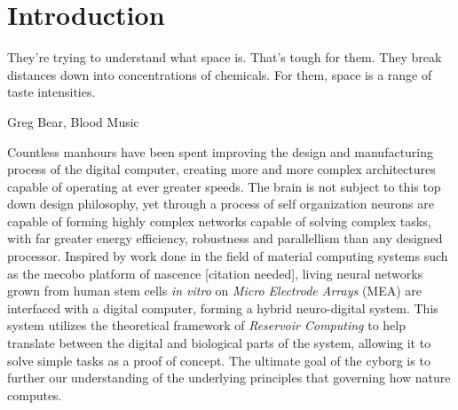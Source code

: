 \chapter{Introduction}
\epigraph{They're trying to understand what space is. That's tough for them.
They break distances down into concentrations of chemicals. For them, space is a
range of taste intensities.}{Greg Bear, Blood Music}
%
Countless manhours have been spent improving the design and manufacturing
process of the digital computer, creating more and more complex architectures
capable of operating at ever greater speeds.
%
The brain is not subject to this top down design philosophy, yet through a
process of self organization neurons are capable of forming highly complex
networks capable of solving complex tasks, with far greater energy efficiency,
robustness and parallellism than any designed processor.
%
Inspired by work done in the field of material computing systems such as the
mecobo platform of nascence [citation needed], living neural networks grown from
human stem cells \emph{in vitro} on \emph{Micro Electrode Arrays} (MEA) are interfaced
with a digital computer, forming a hybrid neuro-digital system.
%
This system utilizes the theoretical framework of \emph{Reservoir Computing} to
help translate between the digital and biological parts of the system, allowing
it to solve simple tasks as a proof of concept.
%
The ultimate goal of the cyborg is to further our understanding of the
underlying principles that governing how nature computes.
